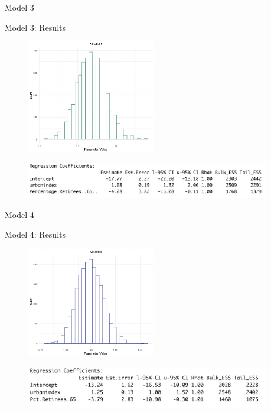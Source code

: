\documentclass{beamer}
\begin{document}
\begin{frame}{Model 3}
\end{frame}


\begin{frame}{Model 3: Results}
    \begin{figure}
        \includegraphics[width=0.5\textwidth]{plots/model3_postui.png}
    \end{figure}
    \begin{figure}
        \includegraphics[width=0.95\textwidth]{plots/model3_coeff.png}
    \end{figure}
\end{frame}


\begin{frame}{Model 4}
    
\end{frame}


\begin{frame}{Model 4: Results}
    \begin{figure}
        \includegraphics[width=0.5\textwidth]{plots/model4_postui.png}
    \end{figure}
    \begin{figure}
        \includegraphics[width=0.95\textwidth]{plots/model4_coeff.png}
    \end{figure}
\end{frame}
\end{document}
